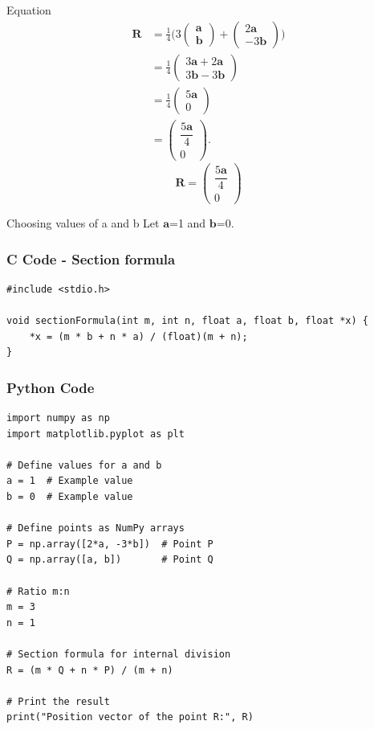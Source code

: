 \documentclass{beamer}
\renewcommand{\vec}[1]{\mathbf{#1}}
\newcommand{\brak}[1]{\begin{pmatrix}#1\end{pmatrix}}
\begin{document}
\begin{frame}{Equation}
\begin{align*}
\vec{R} &= \frac{1}{4}\Big( 3\brak{\vec{a} \\ \vec{b}} + \brak{2\vec{a} \\ -3\vec{b}} \Big) \\
&= \frac{1}{4}\brak{ 3\vec{a} + 2\vec{a} \\ 3\vec{b} - 3\vec{b} } \\
&= \frac{1}{4}\brak{ 5\vec{a} \\ 0 } \\
&= \brak{ \dfrac{5\vec{a}}{4} \\ 0 }.
\end{align*}
\[
\boxed{ \vec{R} = \brak{ \dfrac{5\vec{a}}{4} \\ 0 } }
\]
\end{frame}


\begin{frame}{Choosing values of a and b}
Let $\vec{a}$=1 and $\vec{b}$=0.
\end{frame}


\begin{frame}[fragile]
    \frametitle{C Code - Section formula}

    \begin{lstlisting}
#include <stdio.h>

void sectionFormula(int m, int n, float a, float b, float *x) {
    *x = (m * b + n * a) / (float)(m + n);
}

    \end{lstlisting}
\end{frame}

\begin{frame}[fragile]
    \frametitle{Python Code}

    \begin{lstlisting}
import numpy as np
import matplotlib.pyplot as plt

# Define values for a and b
a = 1  # Example value
b = 0  # Example value

# Define points as NumPy arrays
P = np.array([2*a, -3*b])  # Point P
Q = np.array([a, b])       # Point Q

# Ratio m:n
m = 3
n = 1

# Section formula for internal division
R = (m * Q + n * P) / (m + n)

# Print the result
print("Position vector of the point R:", R)

    \end{lstlisting}
\end{frame}
\end{document}
